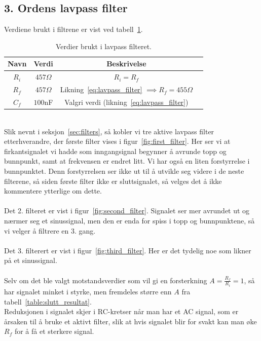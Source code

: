 \documentclass[a4paper,11pt,norsk]{article}
\begin{document}
\subsection{3. Ordens lavpass filter}
\label{sec:filter_realisering}
Verdiene brukt i filtrene er vist ved tabell~\ref{table:filter}.
\begin{table}[htbp]
\centering
\begin{tabular}{ |c|c|c|c| } 
\hline
\textbf{Navn} & \textbf{Verdi} & \textbf{Beskrivelse} \\
\hline
$R_i$ & $457\Omega$ & $R_i = R_f$ \\ 
\hline
$R_f$ & $457\Omega$ & Likning~\ref{eq:lavpass_filter} $\implies R_f = 455\Omega$  \\
\hline
$C_f$ & $100$nF & Valgri verdi (likning~\ref{eq:lavpass_filter}) \\
\hline
\end{tabular}
\caption{Verdier brukt i lavpass filteret.}
\label{table:filter}
\end{table}
\\
Slik nevnt i seksjon~\ref{sec:filters}, så kobler vi tre aktive lavpass filter etterhverandre, der første filter vises i figur~\ref{fig:first_filter}.
Her ser vi at firkantsignalet vi hadde som inngangsignal begynner å avrunde topp og bunnpunkt, samt at frekvensen er endret litt. Vi har også en liten forstyrrelse i bunnpunktet. Denn forstyrrelsen ser ikke ut til å utvikle seg videre i de neste filterene, så siden første filter ikke er sluttsignalet, så velges det å ikke kommentere ytterlige om dette.
\\\\
Det 2. filteret er vist i figur~\ref{fig:second_filter}.
Signalet ser mer avrundet ut og nærmer seg et sinussignal, men den er enda for spiss i topp og bunnpunktene, så vi velger å filtrere en 3. gang.
\\\\
Det 3. filterert er vist i figur~\ref{fig:third_filter}.
Her er det tydelig noe som likner på et sinussignal.
\\\\
Selv om det ble valgt motstandsverdier som vil gi en forsterkning $A = \frac{R_f}{R_i} = 1$, så har signalet minket i styrke, men fremdeles større enn $A$ fra tabell~\ref{table:slutt_resultat}. \\
Reduksjonen i signalet skjer i RC-kretser når man har et AC signal, som er årsaken til å bruke et aktivt filter, slik at hvis signalet blir for svakt kan man øke $R_f$ for å få et sterkere signal.
\\\\
\end{document}
